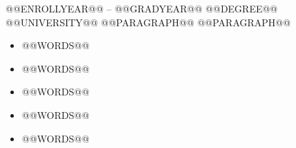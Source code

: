 \documentclass[9pt]{developercv} %
\begin{document}


\begin{entrylist}
	\entry
		{@@ENROLLYEAR@@ -- @@GRADYEAR@@}
		{@@DEGREE@@}
		{@@UNIVERSITY@@}
		{@@PARAGRAPH@@ @@PARAGRAPH@@}
\end{entrylist}

\begin{itemize} \vspace{-10pt}
\item @@WORDS@@ \vspace{-5pt}
\item @@WORDS@@ \vspace{-5pt}
\item @@WORDS@@ \vspace{-5pt}
\item @@WORDS@@ \vspace{-5pt}
\item @@WORDS@@ \vspace{-5pt}
\end{itemize}

\end{document}
